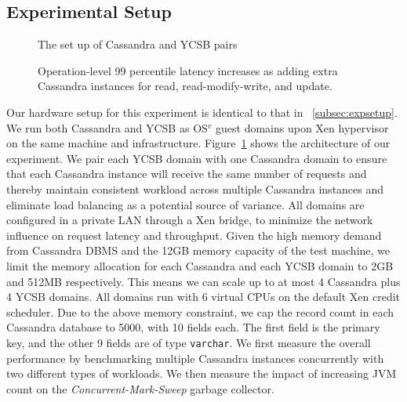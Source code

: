 \documentclass{sig-alternate}
\begin{document}
\subsection{Experimental Setup}
\begin{figure}
\centering
{}
\caption{The set up of Cassandra and YCSB pairs}
\label{fig:cassandrasetup}
\end{figure}

\begin{figure*}

\centering
{}
\caption{Operation-level 99 percentile latency increases as adding extra Cassandra instances for read, read-modify-write, and update.}
\label{fig:cassandraresults}
\end{figure*}

Our hardware setup for this experiment is identical to that in ~\ref{subsec:expsetup}. We run both Cassandra and YCSB as OS$^{v}$ guest domains upon Xen hypervisor on the same machine and infrastructure. Figure~\ref{fig:cassandrasetup} shows the architecture of our experiment. We pair each YCSB domain with one Cassandra domain to ensure that each Cassandra instance will receive the same number of requests and thereby maintain consistent workload across multiple Cassandra instances and eliminate load balancing as a potential source of variance. All domains are configured in a private LAN through a Xen bridge, to minimize the network influence on request latency and throughput. Given the high memory demand from Cassandra DBMS and the 12GB memory capacity of the test machine, we limit the memory allocation for each Cassandra and each YCSB domain to 2GB and 512MB respectively. This means we can scale up to at most 4 Cassandra plus 4 YCSB domains. All domains run with 6 virtual CPUs on the default Xen credit scheduler. Due to the above memory constraint, we cap the record count in each Cassandra database to 5000, with 10 fields each. The first field is the primary key, and the other 9 fields are of type \texttt{varchar}. We first measure the overall performance by benchmarking multiple Cassandra instances concurrently with two different types of workloads. We then measure the impact of increasing JVM count on the \textit{Concurrent-Mark-Sweep} garbage collector.
\end{document}
